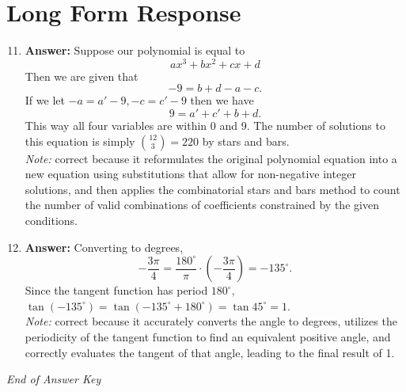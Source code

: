 \documentclass[12pt]{article}
\begin{document}
\section*{Long Form Response}
\begin{enumerate}[label=\arabic*.]
\setcounter{enumi}{10}
\item \textbf{Answer:} Suppose our polynomial is equal to\[ax^3+bx^2+cx+d\]Then we are given that\[-9=b+d-a-c.\]If we let $-a=a'-9, -c=c'-9$ then we have\[9=a'+c'+b+d.\]This way all four variables are within 0 and 9. The number of solutions to this equation is simply $\binom{12}{3}=\boxed{220}$ by stars and bars.
\\ \textit{Note:} correct because it reformulates the original polynomial equation into a new equation using substitutions that allow for non-negative integer solutions, and then applies the combinatorial stars and bars method to count the number of valid combinations of coefficients constrained by the given conditions.
\item \textbf{Answer:} Converting to degrees, \[-\frac{3 \pi}{4} = \frac{180^\circ}{\pi} \cdot \left( -\frac{3 \pi}{4} \right) = -135^\circ.\]Since the tangent function has period $180^\circ,$ $\tan (-135^\circ) = \tan (-135^\circ + 180^\circ) = \tan 45^\circ = \boxed{1}.$
\\ \textit{Note:} correct because it accurately converts the angle to degrees, utilizes the periodicity of the tangent function to find an equivalent positive angle, and correctly evaluates the tangent of that angle, leading to the final result of 1.
\end{enumerate}

\vfill
\noindent\textit{End of Answer Key}
\end{document}
